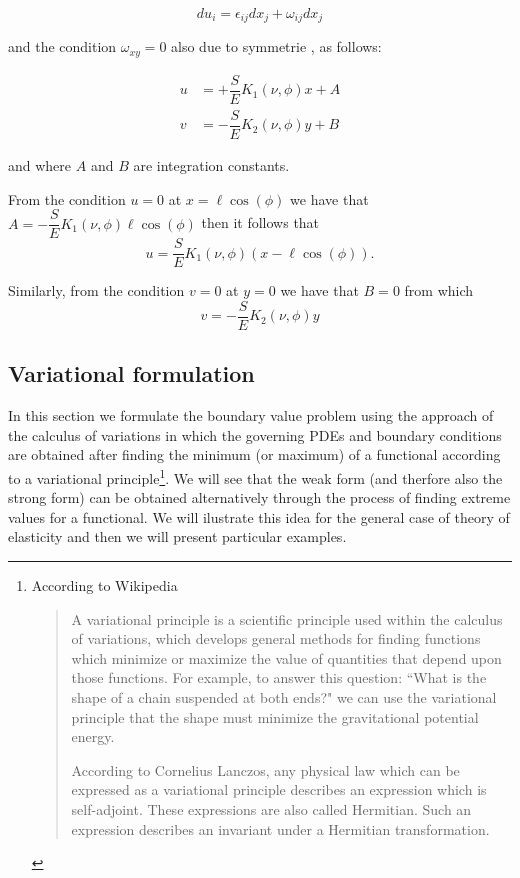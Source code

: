 \[du_i=\epsilon_{ij}dx_j + \omega_{ij}dx_j\]

and the condition $\omega_{xy}=0$ also due to symmetrie , as follows:

\begin{align*}
u &= +\dfrac{S}{E} K_{1}(\nu , \phi)x + A\\
v &= -\dfrac{S}{E} K_{2}(\nu , \phi)y + B
\end{align*}

and where $A$ and $B$ are integration constants.

From the condition $u=0$ at $x=\ell\cos(\phi)$ we have that $A=-\dfrac{S}{E} K_{1}(\nu , \phi)\ell\cos(\phi)$ then it follows that
\[u=\dfrac{S}{E} K_{1}(\nu , \phi)(x-\ell\cos(\phi)).\]

Similarly, from the condition $v=0$ at $y=0$ we have that $B=0$ from which
\[v=-\dfrac{S}{E} K_{2}(\nu , \phi)y\]



\subsection{Variational formulation}
In this section we formulate the boundary value problem using the approach of the calculus of variations in which the governing PDEs and boundary conditions are obtained after finding the minimum (or maximum) of a functional according to a variational principle\footnote{According to Wikipedia \cite{wiki:variational_principle}

\begin{quotation}
A variational principle is a scientific principle used within the calculus of variations, which develops general methods for finding functions which minimize or maximize the value of quantities that depend upon those functions. For example, to answer this question: ``What is the shape of a chain suspended at both ends?" we can use the variational principle that the shape must minimize the gravitational potential energy.

According to Cornelius Lanczos, any physical law which can be expressed as a variational principle describes an expression which is self-adjoint. These expressions are also called Hermitian. Such an expression describes an invariant under a Hermitian transformation.
\end{quotation}}.
We will see that the weak form (and therfore also the strong form) can be obtained alternatively through the process of finding extreme values for a functional. We will ilustrate this idea for the general case of theory of elasticity and then we will present particular examples.

